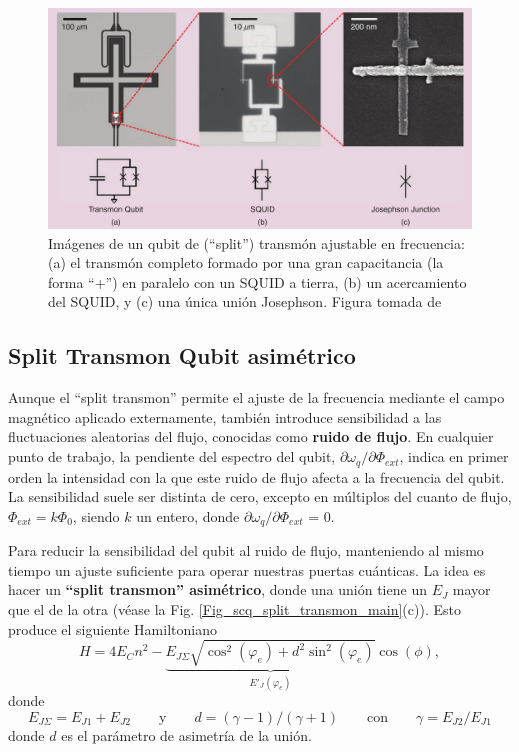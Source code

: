     \begin{figure}[h]
    	\centering 
    	\includegraphics[width=1\linewidth]{Figuras/Fig_scq_split_transmon_real.png}
    	\caption{Imágenes de un qubit de (``split'') transmón ajustable en frecuencia: (a) el transmón completo formado por una gran capacitancia (la forma ``+'') en paralelo con un SQUID a tierra, (b) un acercamiento del SQUID, y (c) una única unión Josephson. Figura tomada de \cite{Bib_scq_transmon_qubit_for_electromagnetic_engineers}}
    	\label{Fig_scq_split_transmon_real}
	\end{figure}



    
    \subsection{Split Transmon Qubit asimétrico}

    Aunque el ``split transmon'' permite el ajuste de la frecuencia mediante el campo magnético aplicado externamente, también introduce sensibilidad a las fluctuaciones aleatorias del flujo, conocidas como \textbf{ruido de flujo}. En cualquier punto de trabajo, la pendiente del espectro del qubit, $\partial \omega_q/\partial \Phi_{ext}$, indica en primer orden la intensidad con la que este ruido de flujo afecta a la frecuencia del qubit. La sensibilidad suele ser distinta de cero, excepto en múltiplos del cuanto de flujo, $\Phi_{ext} = k \Phi_0$, siendo $k$ un entero, donde $\partial \omega_q/\partial \Phi_{ext}$ = 0.

    Para reducir la sensibilidad del qubit al ruido de flujo, manteniendo al mismo tiempo un ajuste suficiente para operar nuestras puertas cuánticas. La idea es hacer un \textbf{``split transmon'' asimétrico}, donde una unión tiene un $E_J$ mayor que el de la otra (véase la Fig. \ref{Fig_scq_split_transmon_main}(c)). Esto produce el siguiente Hamiltoniano
    \begin{equation}
        H = 4 E_C n^2 - \underbrace{E_{J \varSigma} \sqrt{\cos^2(\varphi_e) + d^2 \sin^2(\varphi_e)}}_{E'_J(\varphi_e)} \cos(\phi),  
    \end{equation}
    donde 
    \begin{equation} \label{ec_scq_split_transmon_asym_H}
        E_{J\varSigma} = E_{J1} + E_{J2} 
        \qquad \text{y} \qquad d = (\gamma - 1)/(\gamma + 1)
        \qquad \text{con} \qquad \gamma=E_{J2}/E_{J1}
    \end{equation}
    donde $d$ es  el parámetro de asimetría de la unión. 
    
